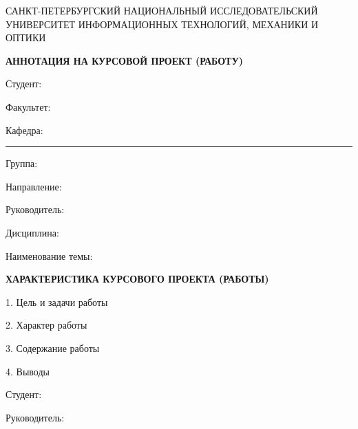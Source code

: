 \thispagestyle{empty}


\begin{center}
{\small САНКТ-ПЕТЕРБУРГСКИЙ НАЦИОНАЛЬНЫЙ ИССЛЕДОВАТЕЛЬСКИЙ УНИВЕРСИТЕТ ИНФОРМАЦИОННЫХ ТЕХНОЛОГИЙ, МЕХАНИКИ И ОПТИКИ}

\textbf{АННОТАЦИЯ НА КУРСОВОЙ ПРОЕКТ (РАБОТУ)}
\end{center}

Студент:  

Факультет: 

Кафедра: \rule{10em}{.1pt} Группа: 

Направление:  

Руководитель: 

Дисциплина: 

\hrulefill

Наименование темы: 

\hrulefill

\begin{center}
\textbf{ХАРАКТЕРИСТИКА КУРСОВОГО ПРОЕКТА (РАБОТЫ)}
\end{center}

1. Цель и задачи работы

\hrulefill

\hrulefill

\hrulefill

\hrulefill

2. Характер работы

3. Содержание работы

\hrulefill

\hrulefill

\hrulefill

\hrulefill

\hrulefill

4. Выводы

\hrulefill

\hrulefill

\hrulefill

\hrulefill

Студент: \hrulefill

Руководитель: \hrulefill

